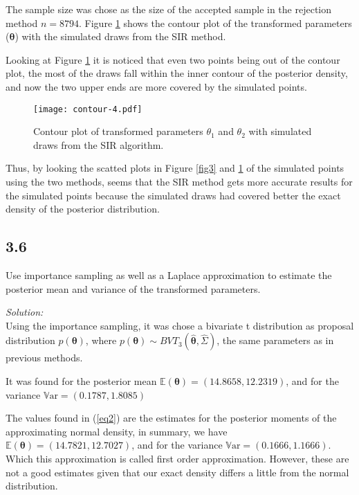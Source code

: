 \documentclass[a4paper, 11pt]{article}
\begin{document}
The sample size was chose as the size of the accepted sample in the rejection method $n=8794$. Figure \ref{fig4} shows the contour plot of the transformed parameters ($\boldsymbol{\theta}$) with the simulated draws from the SIR method. 

Looking at Figure \ref{fig4} it is noticed that even two points being out of the contour plot, the most of the draws fall within the inner contour of the posterior density, and now the two upper ends are more covered by the simulated points.

\begin{figure}[H]
\centering
\caption{Contour plot of transformed parameters $\theta_1$ and $\theta_2$ with simulated draws from the SIR algorithm.}
\label{fig4}
\texttt{[image: contour-4.pdf]}
\end{figure}

Thus, by looking the scatted plots in Figure \ref{fig3} and \ref{fig4} of the simulated points using the two methods, seems that the SIR method gets more accurate results for the simulated points because the simulated draws had covered better the exact density of the posterior distribution.

\subsection*{3.6} Use importance sampling as well as a Laplace approximation to estimate the posterior mean and variance of the transformed parameters.

\noindent
\textit{Solution:}\\

Using the importance sampling, it was chose a bivariate t distribution as proposal distribution $p(\boldsymbol{\theta})$, where $p(\boldsymbol{\theta}) \sim BVT_{3}(\boldsymbol{\hat{\theta}}, \hat{\Sigma})$, the same parameters as in previous methods.

It was found for the posterior mean $\mathds{E} (\boldsymbol{\theta}) = (14.8658, 12.2319)$, and for the variance $\mathds{V}\mbox{ar} = (0.1787,1.8085)$

The values found in (\ref{eq2}) are the estimates for the posterior moments of the approximating normal density, in summary, we have $\mathds{E} (\boldsymbol{\theta}) = (14.7821, 12.7027)$, and for the variance $\mathds{V}\mbox{ar} = (0.1666,1.1666)$. Which this approximation is called first order approximation. However, these are not a good estimates given that our exact density differs a little from the normal distribution. 
\end{document}
